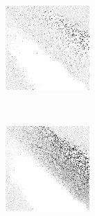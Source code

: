 \begin{figure}
\begin{subfigure}[t]{0.22\textwidth}
		\caption{\handmaxavg}
	\end{subfigure}
	~
	\begin{subfigure}[t]{0.22\textwidth}
		\includegraphics[width=\textwidth]{images/findings/round2/strats/random/hand_max_med.png}
		\caption{\handmaxmed}
	\end{subfigure}
	~
	\begin{subfigure}[t]{0.22\textwidth}
		\includegraphics[width=\textwidth]{images/findings/round2/strats/random/hand_max_poss.png}
		\caption{\handmaxposs}
	\end{subfigure}


\end{figure}
